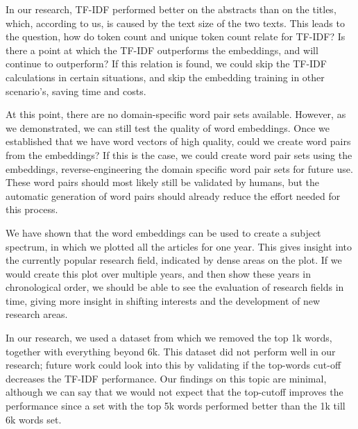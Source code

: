 \documentclass[../../Thesis.tex]{subfiles}
\begin{document}
In our research, TF-IDF performed better on the abstracts than on the titles, which, according to us, is caused by the text size of the two texts. This leads to the question, how do token count and unique token count relate for TF-IDF? Is there a point at which the TF-IDF outperforms the embeddings, and will continue to outperform? If this relation is found,  we could skip the TF-IDF calculations in certain situations, and skip the embedding training in other scenario's, saving time and costs.

At this point, there are no domain-specific word pair sets available. However, as we demonstrated, we can still test the quality of word embeddings. Once we established that we have word vectors of high quality, could we create word pairs from the embeddings? If this is the case, we could create word pair sets using the embeddings, reverse-engineering the domain specific word pair sets for future use. These word pairs should most likely still be validated by humans, but the automatic generation of word pairs should already reduce the effort needed for this process.

We have shown that the word embeddings can be used to create a subject spectrum, in which we plotted all the articles for one year. This gives insight into the currently popular research field, indicated by dense areas on the plot. If we would create this plot over multiple years, and then show these years in chronological order, we should be able to see the evaluation of research fields in time, giving more insight in shifting interests and the development of new research areas.

In our research, we used a dataset from which we removed the top 1k words, together with everything beyond 6k. This dataset did not perform well in our research; future work could look into this by validating if the top-words cut-off decreases the TF-IDF performance. Our findings on this topic are minimal, although we can say that we would not expect that the top-cutoff improves the performance since a set with the top 5k words performed better than the 1k till 6k words set.
\end{document}
